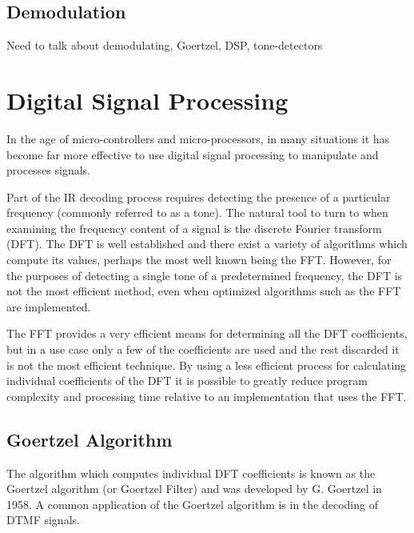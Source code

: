 


\subsection{Demodulation}
Need to talk about demodulating, Goertzel, DSP, tone-detectors


\section{Digital Signal Processing}
In the age of micro-controllers and micro-processors, in many situations it has become far more effective to use digital signal processing to manipulate and processes signals.

Part of the IR decoding process requires detecting the presence of a particular frequency (commonly referred to as a tone). The natural tool to turn to when examining the frequency content of a signal is the discrete Fourier transform (DFT). The DFT is well established and there exist a variety of algorithms which compute its values, perhaps the most well known being the FFT. However, for the purposes of detecting a single tone of a predetermined frequency, the DFT is not the most efficient method, even when optimized algorithms such as the FFT are implemented.

The FFT provides a very efficient means for determining all the DFT coefficients, but in a use case only a few of the coefficients are used and the rest discarded it is not the most efficient technique. By using a less efficient process for calculating individual coefficients of the DFT it is possible to greatly reduce program complexity and processing time relative to an implementation that uses the FFT.

\subsection{Goertzel Algorithm}

The algorithm which computes individual DFT coefficients is known as the Goertzel algorithm (or Goertzel Filter) and was developed by G. Goertzel in 1958. \cite{Goertzel1958} A common application of the Goertzel algorithm is in the decoding of DTMF\footnotemark{} signals.

